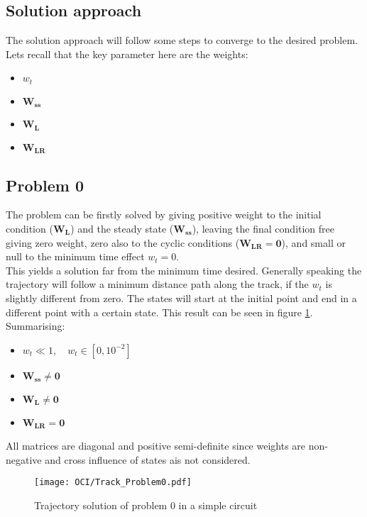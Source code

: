 \subsection{Solution approach}
%
The solution approach will follow some steps to converge to the desired problem. Lets recall that the key parameter here are the weights:
\begin{itemize}
    \item $w_t$
    \item $\mathbf{W_{ss}}$
    \item $\mathbf{W_{L}}$
    \item $\mathbf{W_{LR}}$
\end{itemize}
%
\subsection*{Problem 0}
%
The problem can be firstly solved by giving positive weight to the initial condition ($\mathbf{W_{L}}$) and the steady state ($\mathbf{W_{ss}}$), leaving the final condition free giving zero weight, zero also to the cyclic conditions ($\mathbf{W_{LR}}=\mathbf{0}$), and small or null to the minimum time effect $w_t=0$.\\
This yields a solution far from the minimum time desired. Generally speaking the trajectory will follow a minimum distance path along the track, if the $w_t$ is slightly different from zero. The states will start at the initial point and end in a different point with a certain state. This result can be seen in figure \ref{fig:Problem0}.\\
Summarising:
\begin{itemize}
    \item $w_t \ll 1 , \quad  w_t \in [0,10^{-2}] $
    \item $\mathbf{W_{ss}} \neq \mathbf{0} $
    \item $\mathbf{W_{L}} \neq \mathbf{0}  $
    \item $\mathbf{W_{LR}} = \mathbf{0}$
\end{itemize}
All matrices are diagonal and positive semi-definite since weights are non-negative and cross influence of states ais not considered. 
%
\begin{figure}[h!]
    \centering
    \texttt{[image: OCI/Track\_Problem0.pdf]}
    \caption{Trajectory solution of problem 0 in a simple circuit}
    \label{fig:Problem0}
\end{figure}
%
